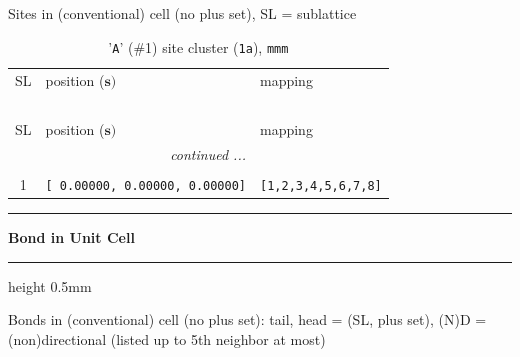 \documentclass[fleqn,10pt,landscape]{jsarticle}
\begin{document}
\noindent Sites in (conventional) cell (no plus set), SL = sublattice

\renewcommand{\arraystretch}{1.6}
\begin{longtable}[l]{cll}
\captionsetup{justification=raggedright, singlelinecheck=off}
\caption{'\texttt{A}' (\#1) site cluster (\texttt{1a}), \texttt{mmm}}
 \\
 \hline \hline
SL & position ($\bm{s})$ & mapping \\ \hline \endfirsthead

\multicolumn{2}{l}{\tablename\ \thetable{}} \\
 \hline \hline
SL & position ($\bm{s})$ & mapping \\ \hline \endhead

 \hline \hline
\multicolumn{2}{r}{\footnotesize\it continued ...} \\ \endfoot

 \hline \hline
\multicolumn{2}{r}{} \\ \endlastfoot

1 & \texttt{[ 0.00000, 0.00000, 0.00000]} & \texttt{[1,2,3,4,5,6,7,8]} \\
\end{longtable}
\vspace{5mm}
\noindent \rule[0.5mm]{5mm}{0.5mm}\hspace{3mm}\textbf{Bond in Unit Cell}\hspace{3mm}\leaders\hrule height 0.5mm\hfill\kern0pt
\vspace{3mm}

\noindent Bonds in (conventional) cell (no plus set): tail, head = (SL, plus set), (N)D = (non)directional (listed up to 5th neighbor at most)
\end{document}
